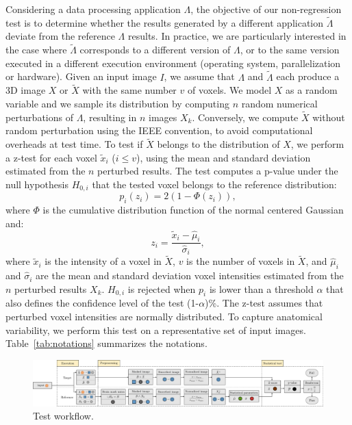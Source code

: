 \documentclass{article}
\begin{document}
Considering a data processing application $\Lambda$, the objective of our non-regression test is to determine whether the results generated by a different application $\tilde \Lambda$ deviate from the reference $\Lambda$ results. In practice, we are particularly interested in the case where $\tilde \Lambda$ corresponds to a different version of $\Lambda$, or to the same version executed in a different execution environment (operating system, parallelization or hardware). Given an input image $I$, we assume that $\Lambda$ and $\tilde \Lambda$ each produce a 3D image $X$ or $\tilde X$ with the same number $v$ of voxels. We model $X$ as a random variable and we sample its distribution by computing $n$ random numerical perturbations of $\Lambda$, resulting in $n$ images $X_k$. Conversely, we compute $\tilde X$ without random perturbation using the IEEE convention, to avoid computational overheads at test time. To test if $\tilde X$ belongs to the distribution of $X$, we perform a z-test for each voxel $\tilde x_i$ ($i\leq v$), using the mean and standard deviation estimated from the $n$ perturbed results. The test computes a p-value under the null hypothesis $H_{0,i}$ that the tested voxel belongs to the reference distribution:
\begin{equation} \label{eq:pval}
    p_i(z_i) = 2 \left(1-\Phi(z_i)\right),
\end{equation}
where $\Phi$ is the cumulative distribution function of the normal centered
Gaussian and:
\begin{equation*}
    z_i = \frac{\tilde x_i-\hat \mu_i}{\hat \sigma_i},
\end{equation*}
where $\tilde x_i$ is the intensity of a voxel in $\tilde X$, $v$ is the number of voxels in $\tilde X$, and $\hat \mu_i$ and $\hat \sigma_i$ are the mean and standard deviation voxel intensities estimated from the $n$ perturbed results $X_k$. $H_{0,i}$ is rejected when $p_i$ is lower than a threshold $\alpha$ that also defines the confidence level of the test (1-$\alpha$)\%. The z-test assumes that perturbed voxel intensities are normally distributed. To capture anatomical variability, we perform this test on a representative set of input images. Table~\ref{tab:notations} summarizes the notations.

\begin{figure}
    \centering
    \includegraphics[width=\linewidth]{figures/workflow_H.pdf}
    \caption{Test workflow.}
    \label{fig:test_workflow}
\end{figure}
\end{document}
